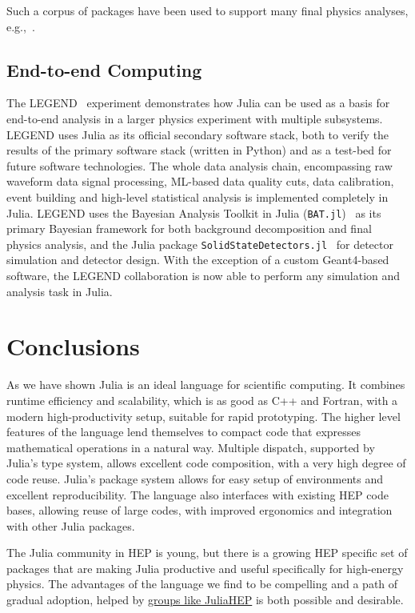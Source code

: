 \documentclass{webofc}
\begin{document}
Such a corpus of packages have been used to support many final physics
analyses, e.g.,~\cite{Aaij2022,PhysRevD.104.L091102,Bibrzycki2021}.

\subsection{End-to-end Computing}
\label{sec:e2dlegend}

The LEGEND~\cite{LEGEND:2017AIPC} experiment demonstrates how Julia can be used
as a basis for end-to-end analysis in a larger physics experiment with multiple
subsystems. LEGEND uses Julia as its official secondary software stack, both to
verify the results of the primary software stack (written in Python) and as a
test-bed for future software technologies. The whole data analysis chain,
encompassing raw waveform data signal processing, ML-based data quality cuts,
data calibration, event building and high-level statistical analysis is
implemented completely in Julia. LEGEND uses the Bayesian Analysis
Toolkit in Julia (\texttt{BAT.jl})~\cite{Schulz:2021BAT} as its primary Bayesian
framework for both background decomposition and final physics analysis, and the
Julia package \texttt{SolidStateDetectors.jl}~\cite{Abt:2021SSD} for detector simulation
and detector design. With the exception of a custom Geant4-based software, the
LEGEND collaboration is now able to perform any simulation and analysis task in
Julia.


\section{Conclusions}

As we have shown Julia is an ideal language for scientific computing. It
combines runtime efficiency and scalability, which is as good as C++ and
Fortran, with a modern high-productivity setup, suitable for rapid prototyping.
The higher level features of the language lend themselves to compact code that
expresses mathematical operations in a natural way. Multiple dispatch, supported
by Julia's type system, allows excellent code composition, with a very high
degree of code reuse. Julia's package system allows for easy setup of
environments and excellent reproducibility. The language also interfaces with
existing HEP code bases, allowing reuse of large codes, with improved ergonomics
and integration with other Julia packages.

The Julia community in HEP is young, but there is a growing HEP specific set of
packages that are making Julia productive and useful specifically for
high-energy physics. The advantages of the language we find to be compelling and
a path of gradual adoption, helped by
\href{https://hepsoftwarefoundation.org/activities/juliahep.html}{groups like
JuliaHEP} is both possible and desirable.

\sloppy
\raggedright

\end{document}

